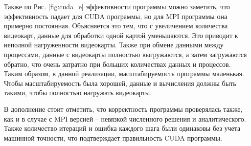 \documentclass[12pt, a4paper]{article}
\begin{document}
            Также по Рис. \ref{fig:cuda_e} эффективности программы можно заметить, что эффективность падает для CUDA программы, но для MPI программы она примерно постоянная. Объясняется это тем, что с увеличением количества видеокарт, данные для обработки одной картой уменьшаются. Это приводит к неполной нагруженности видеокарты. Также при обмене данными между процессами, данные с видеокарты полностью выгружаются, а затем загружаются обратно, что очень затратно при больших количествах данных и процессов. Таким образом, в данной реализации, масштабируемость программы маленькая. Чтобы масштабируемость была хорошей, данные и вычисления должны быть такими, чтобы полностью нагружать видеокарты.

            В дополнение стоит отметить, что корректность программы проверялась также, как и в случае с MPI версией -- невязкой численного решения и аналитического. Также количество итераций и ошибка каждого шага были одинаковы без учета машинной точности, что подтверждает правильность CUDA программы.
\end{document}
